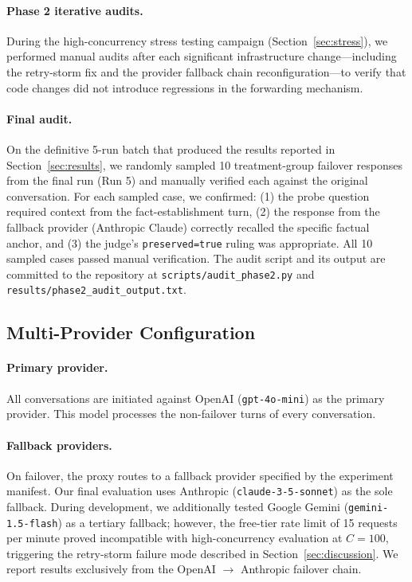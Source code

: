 \paragraph{Phase 2 iterative audits.}
During the high-concurrency stress testing campaign (Section~\ref{sec:stress}), we performed manual audits after each significant infrastructure change---including the retry-storm fix and the provider fallback chain reconfiguration---to verify that code changes did not introduce regressions in the forwarding mechanism.

\paragraph{Final audit.}
On the definitive 5-run batch that produced the results reported in Section~\ref{sec:results}, we randomly sampled 10 treatment-group failover responses from the final run (Run 5) and manually verified each against the original conversation. For each sampled case, we confirmed: (1) the probe question required context from the fact-establishment turn, (2) the response from the fallback provider (Anthropic Claude) correctly recalled the specific factual anchor, and (3) the judge's \texttt{preserved=true} ruling was appropriate. All 10 sampled cases passed manual verification. The audit script and its output are committed to the repository at \texttt{scripts/audit\_phase2.py} and \texttt{results/phase2\_audit\_output.txt}.

\subsection{Multi-Provider Configuration}

\paragraph{Primary provider.}
All conversations are initiated against OpenAI (\texttt{gpt-4o-mini}) as the primary provider. This model processes the non-failover turns of every conversation.

\paragraph{Fallback providers.}
On failover, the proxy routes to a fallback provider specified by the experiment manifest. Our final evaluation uses Anthropic (\texttt{claude-3-5-sonnet}) as the sole fallback. During development, we additionally tested Google Gemini (\texttt{gemini-1.5-flash}) as a tertiary fallback; however, the free-tier rate limit of 15 requests per minute proved incompatible with high-concurrency evaluation at $C=100$, triggering the retry-storm failure mode described in Section~\ref{sec:discussion}. We report results exclusively from the OpenAI $\rightarrow$ Anthropic failover chain.

